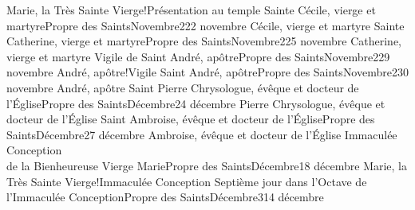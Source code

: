 \documentclass[twoside, french]{book}
\begin{document}
        {}{}{Marie, la Très Sainte Vierge!Présentation au temple}{}{}
        {Sainte Cécile, vierge et martyre}{Propre des Saints}{Novembre}{2}{22 novembre}
        {}{}{Cécile, vierge et martyre}{}{}
        {Sainte Catherine, vierge et martyre}{Propre des Saints}{Novembre}{2}{25 novembre}
        {}{}{Catherine, vierge et martyre}{}{}
        {Vigile de Saint André, apôtre}{Propre des Saints}{Novembre}{2}{29 novembre}
        {}{}{André, apôtre!Vigile}{}{}
        {Saint André, apôtre}{Propre des Saints}{Novembre}{2}{30 novembre}
        {}{}{André, apôtre}{}{}
        {Saint Pierre Chrysologue, évêque et docteur de l’Église}{Propre des Saints}{Décembre}{2}{4 décembre}
        {}{}{Pierre Chrysologue, évêque et docteur de l’Église}{}{}
        {Saint Ambroise, évêque et docteur de l’Église}{Propre des Saints}{Décembre}{2}{7 décembre}
        {}{}{Ambroise, évêque et docteur de l’Église}{}{}
        {Immaculée Conception\\de la Bienheureuse Vierge Marie}{Propre des Saints}{Décembre}{1}{8 décembre}
        {}{}{Marie, la Très Sainte Vierge!Immaculée Conception}{}{}
        {Septième jour dans l’Octave de l’Immaculée Conception}{Propre des Saints}{Décembre}{3}{14 décembre}
        {}{}{}{}{}
\end{document}
